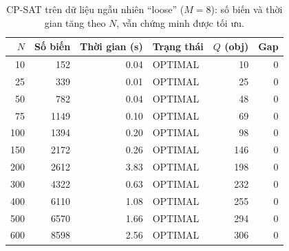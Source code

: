 \begin{table}[ht]
\centering\small
\caption{CP-SAT trên dữ liệu ngẫu nhiên ``loose'' ($M=8$): số biến và thời gian
tăng theo $N$, vẫn chứng minh được tối ưu.}
\label{tab:cpsat-scaling}
\begin{tabular}{rrrlrr}
\toprule
$N$ & Số biến & Thời gian (s) & Trạng thái & $Q$ (obj) & Gap \\
\midrule
10 & 152 & 0.04 & OPTIMAL & 10 & 0 \\
25 & 339 & 0.01 & OPTIMAL & 25 & 0 \\
50 & 782 & 0.04 & OPTIMAL & 48 & 0 \\
75 & 1149 & 0.10 & OPTIMAL & 69 & 0 \\
100 & 1394 & 0.20 & OPTIMAL & 98 & 0 \\
150 & 2172 & 0.26 & OPTIMAL & 146 & 0 \\
200 & 2612 & 3.83 & OPTIMAL & 198 & 0 \\
300 & 4322 & 0.63 & OPTIMAL & 232 & 0 \\
400 & 6110 & 1.08 & OPTIMAL & 255 & 0 \\
500 & 6570 & 1.66 & OPTIMAL & 294 & 0 \\
600 & 8598 & 2.56 & OPTIMAL & 306 & 0 \\
\bottomrule
\end{tabular}
\end{table}
